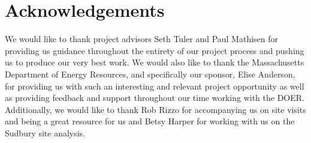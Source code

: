 \chapter*{Acknowledgements}

\noindent
We would like to thank project advisors Seth Tuler and Paul Mathisen for providing us guidance throughout the entirety of our project process and pushing us to produce our very best work. We would also like to thank the Massachusetts Department of Energy Resources, and specifically our sponsor, Elise Anderson, for providing us with such an interesting and relevant project opportunity as well as providing feedback and support throughout our time working with the DOER. Additionally, we would like to thank Rob Rizzo for accompanying us on site visits and being a great resource for us and Betsy Harper for working with us on the Sudbury site analysis.
